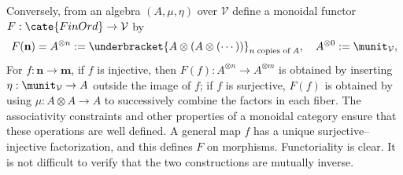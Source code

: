 \begin{remark}
	Conversely, from an algebra $(A,\mu,\eta)$ over $\mathcal{V}$ define a
	monoidal functor $F:\cate{FinOrd}\to\mathcal{V}$ by
	\[ F(\mathbf{n}) = A^{\otimes n} := \underbracket{A \otimes (A \otimes (\cdots))}_{n\;\text{copies of}\; A}, \quad A^{\otimes 0} := \munit_{\mathcal{V}}, \]
	For $f:\mathbf{n}\to\mathbf{m}$, if $f$ is injective, then
	$F(f):A^{\otimes n}\to A^{\otimes m}$ is obtained by inserting
	$\eta:\munit_{\mathcal{V}}\to A$ outside the image of $f$; if $f$ is
	surjective, $F(f)$ is obtained by using $\mu:A\otimes A\to A$ to
	successively combine the factors in each fiber. The associativity
	constraints and other properties of a monoidal category ensure that
	these operations are well defined. A general map $f$ has a unique
	surjective--injective factorization, and this defines $F$ on morphisms.
	Functoriality is clear. It is not difficult to verify that the two
	constructions are mutually inverse.
\end{remark}
